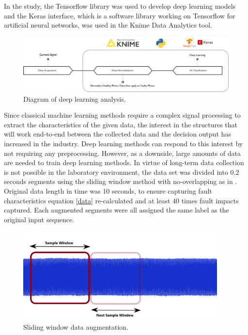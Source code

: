 In the study, the Tensorflow library was used to develop deep learning models and the Keras interface, which is a software library working on Tensorflow for artificial neural networks, was used in the Knime Data Analytics tool.

\begin{figure}[h]
	\centering
	\includegraphics[width=400pt,keepaspectratio=true]{./fig/method4.PNG}
	\caption{Diagram of deep learning analysis.}	
	\label{method4}
\end{figure}

Since classical machine learning methods require a complex signal processing to extract the characteristics of the given data, the interest in the structures that will work end-to-end between the collected data and the decision output has increased in the industry. Deep learning methods can respond to this interest by not requiring any preprocessing. However, as a downside, large amounts of data are needed to train deep learning methods. In virtue of long-term data collection is not possible in the laboratory environment, the data set was divided into 0.2 seconds segments using the sliding window method with no-overlapping as in \cite{shenfield2020novel}. Original data length in time was 10 seconds, to ensure capturing fault characteristics equation \ref{data} re-calculated and at least 40 times fault impacts captured. Each augmented segments were all assigned the same label as the original input sequence.

\begin{figure}[h]
	\centering
	\includegraphics[width=300pt,keepaspectratio=true]{./fig/data.png}
	\caption{Sliding window data augmentation.}	
	\label{dataslide}
\end{figure}

